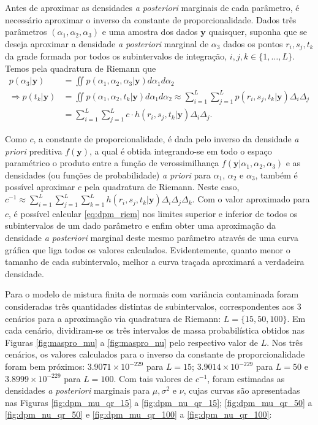 Antes de aproximar as densidades \textit{a posteriori} marginais de cada parâmetro, é necessário aproximar o inverso da constante de proporcionalidade. Dados três parâmetros $(\alpha_1, \alpha_2, \alpha_3)$ e uma amostra dos dados $\bm{y}$ quaisquer, suponha que se deseja aproximar a densidade \textit{a posteriori} marginal de $\alpha_3$ dados os pontos $r_i, s_j, t_k$ da grade formada por todos os subintervalos de integração, $i, j, k \in \{1, \ldots, L\}$. Temos pela quadratura de Riemann que
\begin{align}
p(\alpha_3 | \bm{y})
&= \iint p(\alpha_1, \alpha_2, \alpha_3 | \bm{y}) d\alpha_1 d\alpha_2 \nonumber \\
\Rightarrow p(t_k | \bm{y})
&= \iint p(\alpha_1, \alpha_2, t_k | \bm{y}) d\alpha_1 d\alpha_2 \approx \sum_{i=1}^{L} \sum_{j=1}^{L} p(r_i, s_j, t_k | \bm{y}) \Delta_i \Delta_j \nonumber \\
&= \sum_{i=1}^{L} \sum_{j=1}^{L} c \cdot h(r_i, s_j, t_k | \bm{y}) \Delta_i \Delta_j. \label{eq:dpm_riem}
\end{align}

Como $c$, a constante de proporcionalidade, é dada pelo inverso da densidade \textit{a priori} preditiva $f(\bm{y})$, a qual é obtida integrando-se em todo o espaço paramétrico o produto entre a função de verossimilhança $f(\bm{y} | \alpha_1, \alpha_2, \alpha_3)$ e as densidades (ou funções de probabilidade) \textit{a priori} para $\alpha_1$, $\alpha_2$ e $\alpha_3$, também é possível aproximar $c$ pela quadratura de Riemann. Neste caso, $c^{-1} \approx \sum_{i=1}^{L} \sum_{j=1}^{L} \sum_{k=1}^{L} h(r_i, s_j, t_k | \bm{y}) \Delta_i \Delta_j \Delta_k$. Com o valor aproximado para $c$, é possível calcular \eqref{eq:dpm_riem} nos limites superior e inferior de todos os subintervalos de um dado parâmetro e enfim obter uma aproximação da densidade \emph{a posteriori} marginal deste mesmo parâmetro através de uma curva gráfica que liga todos os valores calculados. Evidentemente, quanto menor o tamanho de cada subintervalo, melhor a curva traçada aproximará a verdadeira densidade.

Para o modelo de mistura finita de normais com variância contaminada foram consideradas três quantidades distintas de subintervalos, correspondentes aos 3 cenários para a aproximação via quadratura de Riemann: $L = \{15, 50, 100\}$. Em cada cenário, dividiram-se os três intervalos de massa probabilística obtidos nas Figuras \ref{fig:maspro_mu} a \ref{fig:maspro_nu} pelo respectivo valor de $L$. Nos três cenários, os valores calculados para o inverso da constante de proporcionalidade foram bem próximos: $3.9071 \times 10^{-229}$ para $L = 15$; $3.9014 \times 10^{-229}$ para $L = 50$ e $3.8999 \times 10^{-229}$ para $L = 100$. Com tais valores de $c^{-1}$, foram estimadas as densidades \textit{a posteriori} marginais para $\mu, \sigma^2$ e $\nu$, cujas curvas são apresentadas nas Figuras \ref{fig:dpm_mu_qr_15} a \ref{fig:dpm_nu_qr_15}; \ref{fig:dpm_mu_qr_50} a \ref{fig:dpm_nu_qr_50} e \ref{fig:dpm_mu_qr_100} a \ref{fig:dpm_nu_qr_100}:

